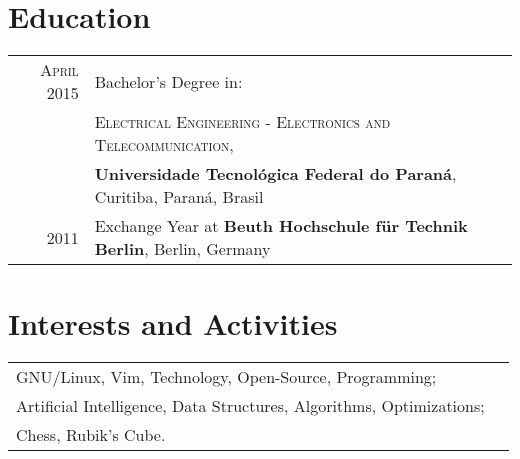 \documentclass[a4paper,10pt]{article}
\begin{document}
\section*{Education}
    \begin{tabular}{rl}
        \textsc{April} 2015 & Bachelor's Degree in: \\
                            &\textsc
                            {Electrical Engineering -
                                Electronics and Telecommunication}, \\

                            &\textbf
                            {Universidade Tecnológica Federal do Paraná},
                            Curitiba, Paraná, Brasil \\

        \textsc{2011}       & Exchange Year at \textbf
                            {Beuth Hochschule für Technik Berlin},
                            Berlin, Germany \\
    \end{tabular}

\section*{Interests and Activities}
\begin{tabular}{@{} ll @{}}
    GNU/Linux, Vim, Technology, Open-Source, Programming; \\
    Artificial Intelligence, Data Structures, Algorithms, Optimizations; \\
    Chess, Rubik's Cube.
\end{tabular}
\end{document}
